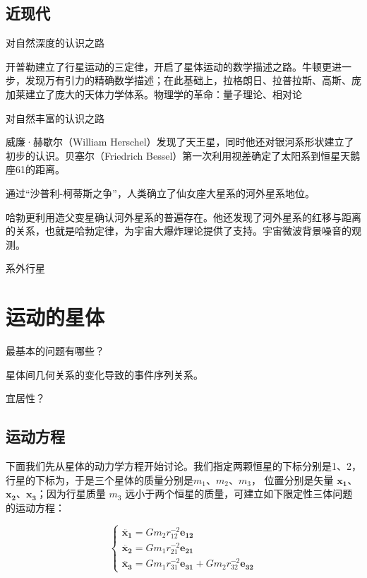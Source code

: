 \documentclass[a4paper,10.5pt]{book}
\begin{document}
\newpage

\section{近现代}

对自然深度的认识之路

开普勒建立了行星运动的三定律，开启了星体运动的数学描述之路。牛顿更进一步，发现万有引力的精确数学描述；在此基础上，拉格朗日、拉普拉斯、高斯、庞加莱建立了庞大的天体力学体系。物理学的革命：量子理论、相对论

对自然丰富的认识之路

威廉·赫歇尔（William Herschel）发现了天王星，同时他还对银河系形状建立了初步的认识。贝塞尔（Friedrich Bessel）第一次利用视差确定了太阳系到恒星天鹅座61的距离。

通过“沙普利-柯蒂斯之争”，人类确立了仙女座大星系的河外星系地位。

哈勃更利用造父变星确认河外星系的普遍存在。他还发现了河外星系的红移与距离的关系，也就是哈勃定律，为宇宙大爆炸理论提供了支持。宇宙微波背景噪音的观测。

系外行星




\chapter{运动的星体}

最基本的问题有哪些？

星体间几何关系的变化导致的事件序列关系。

宜居性？

\section{运动方程}

下面我们先从星体的动力学方程开始讨论。我们指定两颗恒星的下标分别是1、2，行星的下标为，于是三个星体的质量分别是$m_1$、$m_2$、$m_3$，
位置分别是矢量 $\mathbf{x_1}$、$\mathbf{x_2}$、$\mathbf{x_3}$；因为行星质量 $m_3$ 远小于两个恒星的质量，可建立如下限定性三体问题的运动方程：

$$
\begin{cases}
\ddot{\mathbf{x_1}} = Gm_2r_{12}^{-2} \mathbf{e_{12}}\\
\ddot{\mathbf{x_2}} = Gm_1r_{21}^{-2} \mathbf{e_{21}}\\
\ddot{\mathbf{x_3}} = Gm_1r_{31}^{-2} \mathbf{e_{31}} + Gm_2r_{32}^{-2} \mathbf{e_{32}}
\end{cases}
$$
\end{document}
